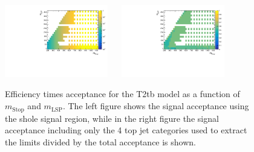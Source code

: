 \begin{figure}[h!]
  \begin{center}
    \includegraphics[width=0.4\textwidth]{figures/jetRanking/T2tb/eff/T2tb_merging_9_cats.pdf} ~~
    \includegraphics[width=0.4\textwidth]{figures/susyResults/T2tb_doubleRatioAcceptance.pdf} \\
    \caption{
      Efficiency times acceptance for the T2tb model as a function of $m_{\mathrm{Stop}}$ and $m_{\mathrm{LSP}}$.
      The left figure shows the signal acceptance using the shole signal region, 
      while in the right figure the signal acceptance including only the 4 top jet categories used to extract the limits divided by the total acceptance is shown.
    }
    \label{fig:sig-eff-T2tb}
  \end{center}
\end{figure}

